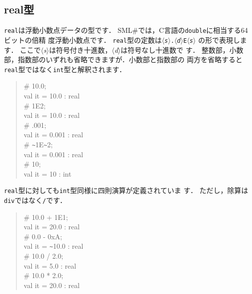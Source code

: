 \documentclass{jbook}
\newcommand{\smlsharp}{SML\#}
\newcommand{\code}[1]{\mbox{\large\tt #1}}
\newcommand{\nonterm}[1]{\mbox{$\langle$}{\it #1}\mbox{$\rangle$}}
\newenvironment{program}{\begin{quote}\begin{tt}}%
                        {\end{tt}\end{quote}}
\begin{document}
\subsection{real型}
	{\tt real}は浮動小数点データの型です．
	\smlsharp{}では，C言語の\code{double}に相当する64ビットの倍精
度浮動小数点です．
	{\tt real}型の定数は{\tt \nonterm{s}.\nonterm{d}E\nonterm{s}}
の形で表現します．
	ここで\nonterm{s}は符号付き十進数，\nonterm{d}は符号なし十進数で
す．
	整数部，小数部，指数部のいずれも省略できますが．小数部と指数部の
両方を省略すると{\tt real}型ではなく{\tt int}型と解釈されます．
\begin{program}
\# 10.0;\\
val it = 10.0 : real\\
\# 1E2;\\
val it = 10.0 : real\\
\# .001;\\
val it = 0.001 : real\\
\# \verb|~|1E\verb|~|2;\\
val it = 0.001 : real\\
\# 10;\\
val it = 10 : int
\end{program}
	{\tt real}型に対しても{\tt int}型同様に四則演算が定義されていま
す．
	ただし，除算は{\tt div}ではなく{\tt /}です．
\begin{program}
\# 10.0 + 1E1;\\
val it = 20.0 : real\\
\# 0.0 - 0xA;\\
val it = \verb|~|10.0 : real\\
\# 10.0 / 2.0;\\
val it = 5.0 : real\\
\# 10.0 * 2.0;\\
val it = 20.0 : real
\end{program}
\end{document}
